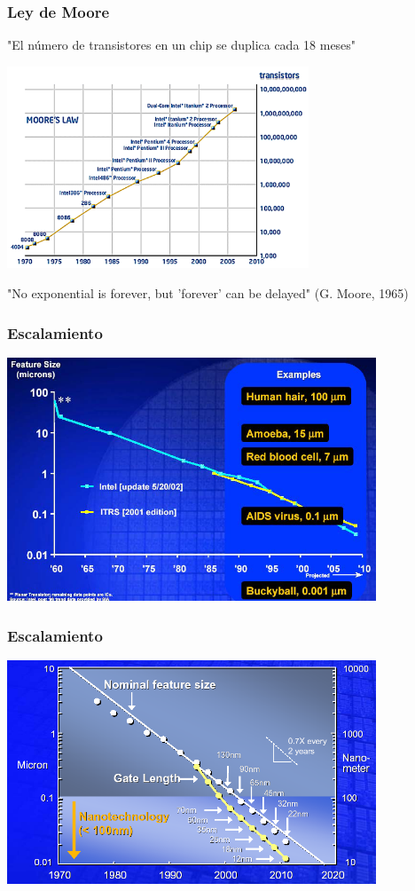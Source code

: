 \documentclass[t,aspectratio=169,10pt]{beamer}
\begin{document}
\begin{frame}
\frametitle{Ley de Moore}
\centering
"El número de transistores en un chip se duplica cada 18 meses"

\includegraphics[width=9cm]{moore}

"No exponential is forever, but 'forever' can be delayed" (G. Moore, 1965)
\end{frame}


\begin{frame}
\frametitle{Escalamiento}
\centering
\includegraphics[width=11cm]{scaling}
\end{frame}

\begin{frame}
\frametitle{Escalamiento}
\centering
\includegraphics[width=11cm]{scaling2}
\end{frame}
\end{document}
